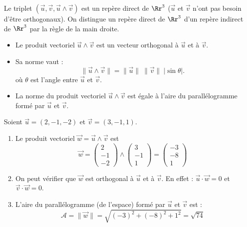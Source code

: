 \documentclass[11pt,class=report,crop=false]{standalone}
\begin{document}
Le triplet $(\vec u, \vec v, \vec u \wedge \vec v)$ est un repère direct de $\Rr^3$ ($\vec u$ et $\vec v$ n'ont pas besoin d'être orthogonaux). On distingue un repère direct de $\Rr^3$ d'un repère indirect de $\Rr^3$ par la \og{}règle de la main droite\fg{}.




\begin{proposition}
  \sauteligne
\begin{itemize}
    \item Le produit vectoriel $\vec u \wedge \vec v$ est un vecteur orthogonal à $\vec u$ et à $\vec v$.
    \item Sa norme vaut :
$$
    \|\vec u \wedge \vec v\| = \|\vec u\| \; \|\vec v\| \; |\sin \theta|.$$
où $\theta$ est l'angle entre $\vec u$ et $\vec v$.
  \item La norme du produit vectoriel $\vec u \wedge \vec v$ est égale à l'aire du parallélogramme formé par $\vec u$ et $\vec v$.
\end{itemize}
\end{proposition}


\begin{exemple}
Soient $\vec u = (2,-1,-2)$ et $\vec v = (3,-1,1)$.
\begin{enumerate}
    \item Le produit vectoriel $\vec w = \vec u \wedge \vec v$ 
    est 
    $$\vec w  = \begin{pmatrix} 2 \\ -1 \\ -2 \end{pmatrix} \wedge \begin{pmatrix} 3 \\ -1 \\ 1 \end{pmatrix} =
    \begin{pmatrix}
        -3 \\
        -8 \\
        1
    \end{pmatrix}$$
    
    \item On peut vérifier que $\vec w$ est orthogonal à $\vec u$ et à $\vec v$. En effet : $\vec u \cdot \vec w = 0$ et $\vec v \cdot \vec w = 0$.
    
    \item L'aire du parallélogramme (de l'espace) formé par $\vec u$ et $\vec v$ est :
    $$\mathcal{A} = \| \vec w \| = \sqrt{(-3)^2 + (-8)^2 + 1^2} = \sqrt{74}$$

  \end{enumerate}
\end{exemple}
\end{document}
